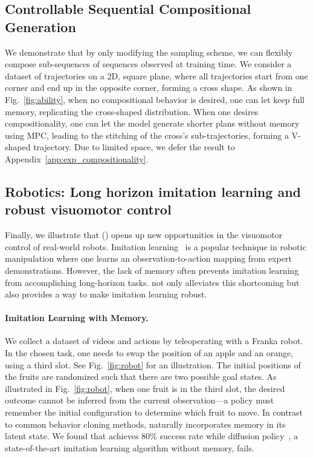 \subsection{Controllable Sequential Compositional Generation}
We demonstrate that by only modifying the sampling scheme, we can flexibly compose sub-sequences of sequences observed at training time.
We consider a dataset of trajectories on a 2D, square plane, where all trajectories start from one corner and end up in the opposite corner, forming a cross shape. As shown in Fig.~\ref{fig:ability}, when no compositional behavior is desired, one can let \algshort{} keep full memory, replicating the cross-shaped distribution. When one desires compositionality, one can let the model generate shorter plans without memory using MPC, leading to the stitching of the cross's sub-trajectories, forming a V-shaped trajectory. Due to limited space, we defer the result to Appendix~\ref{app:exp_compositionality}.


\subsection{Robotics: Long horizon imitation learning and robust visuomotor control}

\label{sec:exp_robot}
Finally, we illustrate that \algo{} (\algshort{}) opens up new opportunities in the visuomotor control of real-world robots. Imitation learning~\cite{chi2023diffusion} is a popular technique in robotic manipulation where one learns an observation-to-action mapping from expert demonstrations. However, the lack of memory often prevents imitation learning from accomplishing long-horizon tasks. \algshort{} not only alleviates this shortcoming but also provides a way to make imitation learning robust.

\paragraph{Imitation Learning with Memory.}
We collect a dataset of videos and actions by teleoperating with a Franka robot. In the chosen task, one needs to swap the position of an apple and an orange, using a third slot. See Fig.~\ref{fig:robot} for an illustration. The initial positions of the fruits are randomized such that there are two possible goal states. As illustrated in Fig.~\ref{fig:robot}, when one fruit is in the third slot, the desired outcome cannot be inferred from the current observation---a policy must remember the initial configuration to determine which fruit to move. In contrast to common behavior cloning methods, \algshort{} naturally incorporates memory in its latent state. We found that \algshort{} achieves $80\%$ success rate while diffusion policy~\cite{chi2023diffusion}, a state-of-the-art imitation learning algorithm without memory, fails. 

